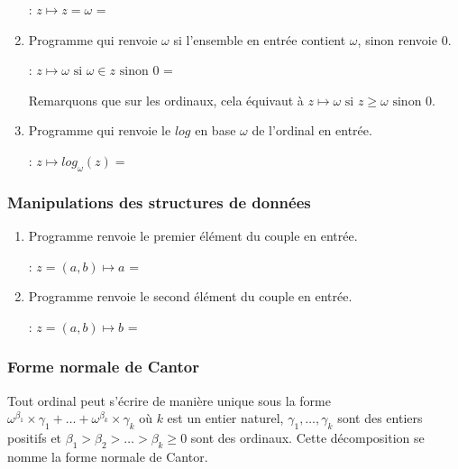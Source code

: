 \documentclass[a4paper, 11pt]{article}
\begin{document}
\begin{enumerate}
    : $z \mapsto z = \omega$ = 
    \item Programme qui renvoie $\omega$ si l'ensemble en entrée contient $\omega$, sinon renvoie 0.
    
    : $z \mapsto \omega \mbox{ si } \omega \in z \mbox{ sinon } 0$ = 
    
    Remarquons que sur les ordinaux, cela équivaut à $z \mapsto \omega \mbox{ si } z \geq \omega \mbox{ sinon } 0$.
    \item Programme qui renvoie le $log$ en base $\omega$ de l'ordinal en entrée.
    
    : $z \mapsto log_{\omega}(z) = $ 

\end{enumerate}


\subsubsection{Manipulations des structures de données}

\begin{enumerate}
    \item Programme renvoie le premier élément du couple en entrée.
    
    : $z = (a, b) \mapsto a$ =  
    \item Programme renvoie le second élément du couple en entrée.
    
    : $z = (a, b) \mapsto b$ =  
\end{enumerate}


\subsubsection{Forme normale de Cantor}

\def\formenormaleun{\mbox{\scriptsize\bfseries $fn_1$}}
\def\formenormaledeux{\mbox{\scriptsize\bfseries $fn_2$}}
\def\formenormaletrois{\mbox{\scriptsize\bfseries $fn_3$}}
\def\formenormalequatre{\mbox{\scriptsize\bfseries $fn_4$}}

Tout ordinal peut s'écrire de manière unique sous la forme $\omega^{\beta_1} \times \gamma_1 + \dots + \omega^{\beta_k} \times \gamma_k$
o\`{u} $k$ est un entier naturel, $\gamma_1, \dots, \gamma_k$ sont des entiers positifs et $\beta_1 > \beta_2 > \dots > \beta_k \geq 0$ sont des ordinaux.
Cette décomposition se nomme la forme normale de Cantor.
\end{document}
